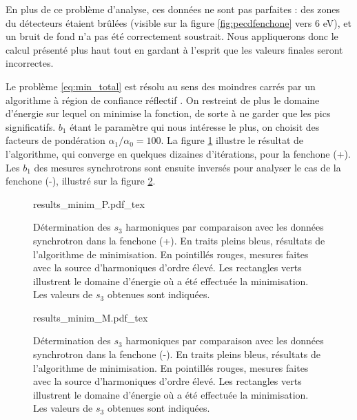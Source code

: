 En plus de ce problème d'analyse, ces données ne sont pas parfaites : des zones du détecteurs étaient brûlées (visible sur la figure \ref{fig:pecdfenchone} vers 6 eV), et un bruit de fond n'a pas été correctement soustrait. Nous appliquerons donc le calcul présenté plus haut tout en gardant à l'esprit que les valeurs finales seront incorrectes. 

Le problème \ref{eq:min_total} est résolu au sens des moindres carrés par un algorithme à région de confiance réflectif . On restreint de plus le domaine d'énergie sur lequel on minimise la fonction, de sorte à ne garder que les pics significatifs. $b_1$ étant le paramètre qui nous intéresse le plus, on choisit des facteurs de pondération $\alpha_1/\alpha_0 = 100$. La figure \ref{fig:results_minim_P} illustre le résultat de l'algorithme, qui converge en quelques dizaines d'itérations, pour la fenchone (+). Les $b_1$ des mesures synchrotrons sont ensuite inversés pour analyser le cas de la fenchone (-), illustré sur la figure \ref{fig:results_minim_M}.

\begin{figure}[!ht]
\centering
\def\svgwidth{0.75\columnwidth}
{results_minim_P.pdf_tex}
\caption{Détermination des $s_3$ harmoniques par comparaison avec les données synchrotron dans la fenchone (+). En traits pleins bleus, résultats de l'algorithme de minimisation. En pointillés rouges, mesures faites avec la source d'harmoniques d'ordre élevé. Les rectangles verts illustrent le domaine d'énergie où a été effectuée la minimisation. Les valeurs de $s_3$ obtenues sont indiquées.}
\label{fig:results_minim_P}
\end{figure}

\begin{figure}[!ht]
\centering
\def\svgwidth{0.75\columnwidth}
{results_minim_M.pdf_tex}
\caption{Détermination des $s_3$ harmoniques par comparaison avec les données synchrotron dans la fenchone (-). En traits pleins bleus, résultats de l'algorithme de minimisation. En pointillés rouges, mesures faites avec la source d'harmoniques d'ordre élevé. Les rectangles verts illustrent le domaine d'énergie où a été effectuée la minimisation. Les valeurs de $s_3$ obtenues sont indiquées.}
\label{fig:results_minim_M}
\end{figure}


